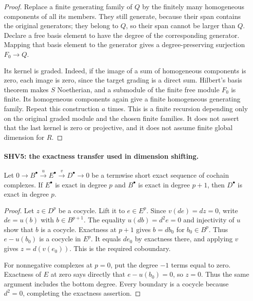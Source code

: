 \begin{proof}
Replace a finite generating family of $Q$ by the finitely many
homogeneous components of all its members.  They still generate,
because their span contains the original generators; they belong to
$Q$, so their span cannot be larger than $Q$.  Declare a free basis
element to have the degree of the corresponding generator.  Mapping
that basis element to the generator gives a degree-preserving
surjection $F_0\to Q$.

Its kernel is graded.  Indeed, if the image of a sum of homogeneous
components is zero, each image is zero, since the target grading
is a direct sum.  Hilbert's basis theorem makes $S$ Noetherian,
and a submodule of the finite free module $F_0$ is finite.
Its homogeneous components again give a finite homogeneous
generating family.  Repeat this construction $a$ times.
This is a finite recursion depending only on the original graded
module and the chosen finite families.  It does not assert that the
last kernel is zero or projective, and it does not assume finite
global dimension for $R$.
\end{proof}

\paragraph{SHV5: the exactness transfer used in dimension shifting.}
\label{claim:SHV5}
Let $0\to B^\bullet\xrightarrow{u}E^\bullet
\xrightarrow{v}D^\bullet\to0$ be a termwise short exact sequence
of cochain complexes.  If $E^\bullet$ is exact in degree $p$
and $B^\bullet$ is exact in degree $p+1$, then $D^\bullet$
is exact in degree $p$.

\begin{proof}
Let $z\in D^p$ be a cocycle.  Lift it to $e\in E^p$.
Since $v(de)=d z=0$, write $de=u(b)$ with $b\in B^{p+1}$.
The equality $u(db)=d^2e=0$ and injectivity of $u$ show that
$b$ is a cocycle.  Exactness at $p+1$ gives $b=db_0$ for
$b_0\in B^p$.  Thus $e-u(b_0)$ is a cocycle in $E^p$.
It equals $de_0$ by exactness there, and applying $v$ gives
$z=d(v(e_0))$.  This is the required coboundary.

For nonnegative complexes at $p=0$, put the degree $-1$ terms
equal to zero.  Exactness of $E$ at zero says directly that
$e-u(b_0)=0$, so $z=0$.  Thus the same argument includes the
bottom degree.  Every boundary is a cocycle because $d^2=0$,
completing the exactness assertion.
\end{proof}

